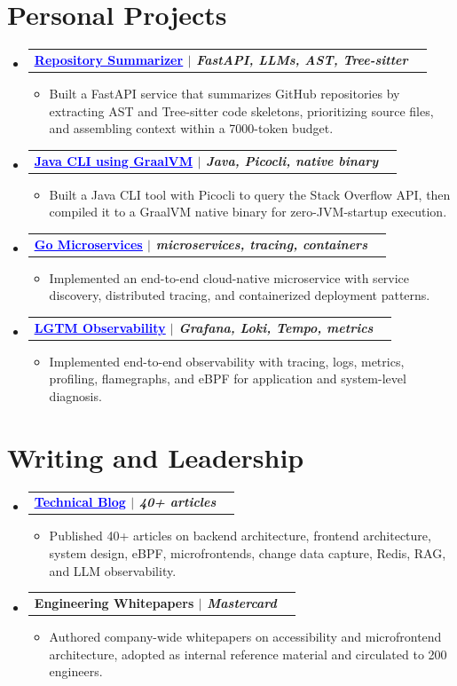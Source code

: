 \documentclass[letterpaper,11pt]{article}
\makeatletter
\newcommand{\resumeItem}[1]{
  \item\small{
    {#1 \vspace{-3pt}}
  }
}
\newcommand{\resumeProjectHeading}[2]{
  \vspace{-3pt}\item
    \begin{tabular*}{1.0\textwidth}[t]{l@{\extracolsep{\fill}}r}
      \textbf{#1} & \textbf{\small #2} \\
    \end{tabular*}\vspace{-7pt}
}
\newcommand{\projectLink}[2]{\href{#1}{\textcolor{blue}{\underline{#2}}}}
\newcommand{\resumeSubHeadingListStart}{\begin{itemize}[leftmargin=0.0in, label={}]}
\newcommand{\resumeSubHeadingListEnd}{\end{itemize}}
\newcommand{\resumeItemListStart}{\begin{itemize}}
\newcommand{\resumeItemListEnd}{\end{itemize}\vspace{0pt}}
\makeatother
\begin{document}
\section{Personal Projects}
\resumeSubHeadingListStart
    \resumeProjectHeading
      {\projectLink{https://github.com/aymanapatel/nebius-project}{Repository Summarizer} \emph{$|$ FastAPI, LLMs, AST, Tree-sitter}}{}
      \resumeItemListStart
        \resumeItem{Built a FastAPI service that summarizes GitHub repositories by extracting AST and Tree-sitter code skeletons, prioritizing source files, and assembling context within a 7000-token budget.}
      \resumeItemListEnd
    \resumeProjectHeading
      {\projectLink{https://github.com/aymanapatel/java-cli}{Java CLI using GraalVM} \emph{$|$ Java, Picocli, native binary}}{}
      \resumeItemListStart
        \resumeItem{Built a Java CLI tool with Picocli to query the Stack Overflow API, then compiled it to a GraalVM native binary for zero-JVM-startup execution.}
      \resumeItemListEnd
    \resumeProjectHeading
      {\projectLink{https://github.com/aymanapatel/golang-microservices}{Go Microservices} \emph{$|$ microservices, tracing, containers}}{}
      \resumeItemListStart
        \resumeItem{Implemented an end-to-end cloud-native microservice with service discovery, distributed tracing, and containerized deployment patterns.}
      \resumeItemListEnd
    \resumeProjectHeading
      {\projectLink{https://aymanace2049.hashnode.dev/grafana-one-observability-tool-to-rule-them-all}{LGTM Observability} \emph{$|$ Grafana, Loki, Tempo, metrics}}{}
      \resumeItemListStart
        \resumeItem{Implemented end-to-end observability with tracing, logs, metrics, profiling, flamegraphs, and eBPF for application and system-level diagnosis.}
      \resumeItemListEnd
\resumeSubHeadingListEnd

\section{Writing and Leadership}
\resumeSubHeadingListStart
    \resumeProjectHeading
      {\projectLink{https://aymanace2049.hashnode.dev}{Technical Blog} \emph{$|$ 40+ articles}}{}
      \resumeItemListStart
        \resumeItem{Published 40+ articles on backend architecture, frontend architecture, system design, eBPF, microfrontends, change data capture, Redis, RAG, and LLM observability.}
      \resumeItemListEnd
    \resumeProjectHeading
      {Engineering Whitepapers \emph{$|$ Mastercard}}{}
      \resumeItemListStart
        \resumeItem{Authored company-wide whitepapers on accessibility and microfrontend architecture, adopted as internal reference material and circulated to 200 engineers.}
      \resumeItemListEnd
\resumeSubHeadingListEnd
\end{document}
